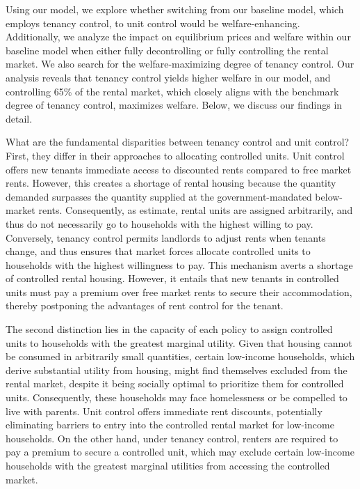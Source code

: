 \documentclass[parskip=full]{article}
\begin{document}
Using our model, we explore whether switching from our baseline model, which employs tenancy control, to unit control would be welfare-enhancing. Additionally, we analyze the impact on equilibrium prices and welfare within our baseline model when either fully decontrolling or fully controlling the rental market. We also search for the welfare-maximizing degree of tenancy control. Our analysis reveals that tenancy control yields higher welfare in our model, and controlling 65\% of the rental market, which closely aligns with the benchmark degree of tenancy control, maximizes welfare. Below, we discuss our findings in detail.

What are the fundamental disparities between tenancy control and unit control? First, they differ in their approaches to allocating controlled units. Unit control offers new tenants immediate access to discounted rents compared to free market rents. However, this creates a shortage of rental housing because the quantity demanded surpasses the quantity supplied at the government-mandated below-market rents. Consequently, as \citet{gl-2003} estimate, rental units are assigned arbitrarily, and thus do not necessarily go to households with the highest willing to pay. Conversely, tenancy control permits landlords to adjust rents when tenants change, and thus ensures that market forces allocate controlled units to households with the highest willingness to pay. This mechanism averts a shortage of controlled rental housing. However, it entails that new tenants in controlled units must pay a premium over free market rents to secure their accommodation, thereby postponing the advantages of rent control for the tenant.

The second distinction lies in the capacity of each policy to assign controlled units to households with the greatest marginal utility. Given that housing cannot be consumed in arbitrarily small quantities, certain low-income households, which derive substantial utility from housing, might find themselves excluded from the rental market, despite it being socially optimal to prioritize them for controlled units. Consequently, these households may face homelessness or be compelled to live with parents. Unit control offers immediate rent discounts, potentially eliminating barriers to entry into the controlled rental market for low-income households. On the other hand, under tenancy control, renters are required to pay a premium to secure a controlled unit, which may exclude certain low-income households with the greatest marginal utilities from accessing the controlled market.
\end{document}
